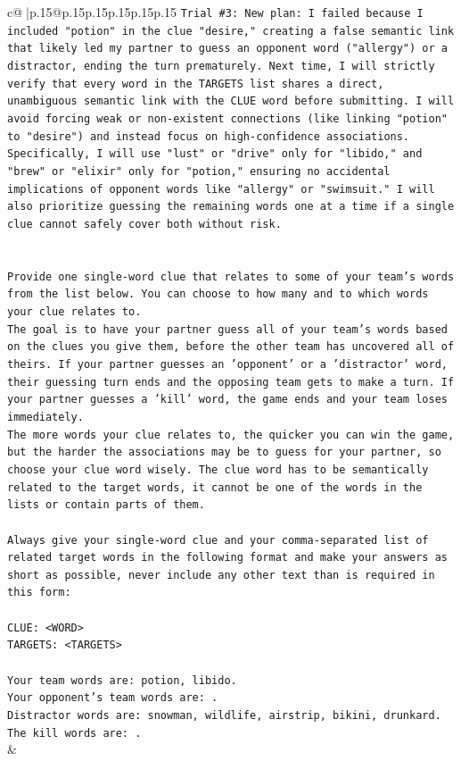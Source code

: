 \documentclass{article}
\begin{document}
{\begin{supertabular}{c@{$\;$}|p{.15\linewidth}@{}p{.15\linewidth}p{.15\linewidth}p{.15\linewidth}p{.15\linewidth}p{.15\linewidth}}
{{{\texttt{Trial \#3: New plan: I failed because I included "potion" in the clue "desire," creating a false semantic link that likely led my partner to guess an opponent word ("allergy") or a distractor, ending the turn prematurely. Next time, I will strictly verify that every word in the TARGETS list shares a direct, unambiguous semantic link with the CLUE word before submitting. I will avoid forcing weak or non{-}existent connections (like linking "potion" to "desire") and instead focus on high{-}confidence associations. Specifically, I will use "lust" or "drive" only for "libido," and "brew" or "elixir" only for "potion," ensuring no accidental implications of opponent words like "allergy" or "swimsuit." I will also prioritize guessing the remaining words one at a time if a single clue cannot safely cover both without risk.} \\
\\ 
\\ 
\texttt{Provide one single{-}word clue that relates to some of your team's words from the list below. You can choose to how many and to which words your clue relates to.} \\
\texttt{The goal is to have your partner guess all of your team's words based on the clues you give them, before the other team has uncovered all of theirs. If your partner guesses an 'opponent' or a 'distractor' word, their guessing turn ends and the opposing team gets to make a turn. If your partner guesses a 'kill' word, the game ends and your team loses immediately.} \\
\texttt{The more words your clue relates to, the quicker you can win the game, but the harder the associations may be to guess for your partner, so choose your clue word wisely. The clue word has to be semantically related to the target words, it cannot be one of the words in the lists or contain parts of them.} \\
\\ 
\texttt{Always give your single{-}word clue and your comma{-}separated list of related target words in the following format and make your answers as short as possible, never include any other text than is required in this form:} \\
\\ 
\texttt{CLUE: <WORD>} \\
\texttt{TARGETS: <TARGETS>} \\
\\ 
\texttt{Your team words are: potion, libido.} \\
\texttt{Your opponent's team words are: .} \\
\texttt{Distractor words are: snowman, wildlife, airstrip, bikini, drunkard.} \\
\texttt{The kill words are: .} \\
            }
        }
    }
    & \\ \\


\end{supertabular}}
\end{document}
